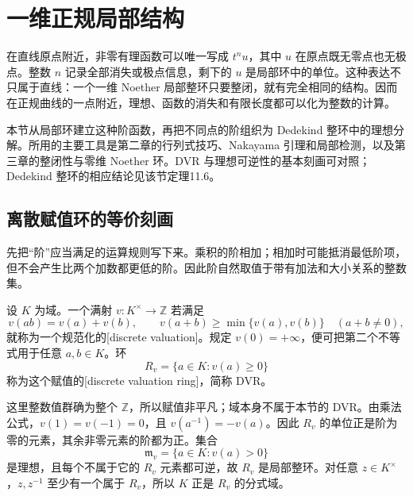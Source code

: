 
% 
% 

\section{一维正规局部结构}
\label{g5:sec:0401}

在直线原点附近，非零有理函数可以唯一写成 \(t^n u\)，其中 \(u\) 在原点既无零点也无极点。整数 \(n\) 记录全部消失或极点信息，剩下的 \(u\) 是局部环中的单位。这种表达不只属于直线：一个一维 Noether 局部整环只要整闭，就有完全相同的结构。因而在正规曲线的一点附近，理想、函数的消失和有限长度都可以化为整数的计算。

\ProseParagraphBreak

本节从局部环建立这种阶函数，再把不同点的阶组织为 Dedekind 整环中的理想分解。所用的主要工具是第二章的行列式技巧、Nakayama 引理和局部检测，以及第三章的整闭性与零维 Noether 环。DVR 与理想可逆性的基本刻画可对照\cite[第11节，定理11.1--11.3，第78--81页]{Matsumura1989}；Dedekind 整环的相应结论见该节定理11.6。

\subsection{离散赋值环的等价刻画}
\label{g5:subsec:0401:01}

先把“阶”应当满足的运算规则写下来。乘积的阶相加；相加时可能抵消最低阶项，但不会产生比两个加数都更低的阶。因此阶自然取值于带有加法和大小关系的整数集。

\begin{definition}
\label{g5:def:discrete-valuation-ring}
	设 \(K\) 为域。一个满射 \(v:K^\times\rightarrow\mathbb Z\) 若满足
	\[
		v(ab)=v(a)+v(b),\qquad
		v(a+b)\geq\min\{v(a),v(b)\}\quad(a+b\ne0),
	\]
	就称为一个规范化的[discrete valuation]。规定 \(v(0)=+\infty\)，便可把第二个不等式用于任意 \(a,b\in K\)。环
	\[
		R_v=\{a\in K:v(a)\geq0\}
	\]
	称为这个赋值的[discrete valuation ring]，简称 DVR。
\end{definition}

这里整数值群确为整个 \(\mathbb Z\)，所以赋值非平凡；域本身不属于本节的 DVR。由乘法公式，\(v(1)=v(-1)=0\)，且 \(v(a^{-1})=-v(a)\)。因此 \(R_v\) 的单位正是阶为零的元素，其余非零元素的阶都为正。集合
\[
	\mathfrak m_v=\{a\in K:v(a)>0\}
\]
是理想，且每个不属于它的 \(R_v\) 元素都可逆，故 \(R_v\) 是局部整环。对任意 \(z\in K^\times\)，\(z,z^{-1}\) 至少有一个属于 \(R_v\)，所以 \(K\) 正是 \(R_v\) 的分式域。

